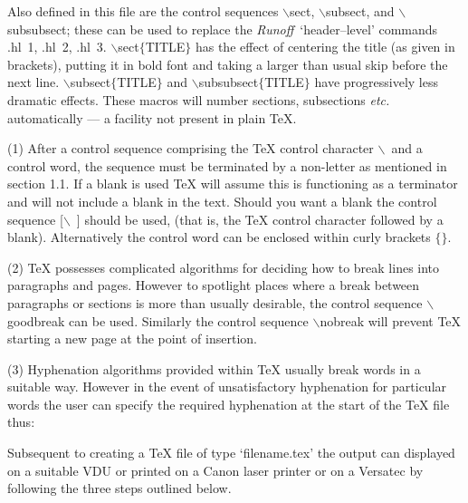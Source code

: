 Also defined in this file are the control sequences $\backslash$sect,
$\backslash$subsect, and $\backslash$subsubsect; these can be used to
replace the {\it Runoff}\
`header--level' commands .hl~1, .hl~2, .hl~3.
$\backslash$sect$\{$TITLE$\}$  has
the effect of centering the
title (as given in brackets), putting it in bold font and taking a larger than
usual skip before the next line.
$\backslash$subsect$\{$TITLE$\}$ and $\backslash$subsubsect$\{$TITLE$\}$
have progressively less dramatic effects.
These macros will number sections, subsections {\it etc.} automatically ---
a facility not present in plain \TeX.


\item{(1)} After a control sequence comprising the {\TeX} control character $\backslash$\
and a control word, the sequence must be terminated by
a non-letter as mentioned in section 1.1.
If a blank is used {\TeX} will assume this is functioning as a
terminator and will not include a blank in the text.
Should you want a blank the control sequence [$\backslash$\ ] should
be used, (that is, the {\TeX} control character followed by a blank).
Alternatively the control word can be enclosed within curly brackets $\{ \}$.

\item{(2)} {\TeX} possesses complicated algorithms for deciding how to break
lines into paragraphs and pages.
However to spotlight places where a break between paragraphs or
sections is more than usually desirable, the  control sequence $\backslash$goodbreak
can be used.
Similarly the control sequence $\backslash$nobreak will prevent {\TeX} starting a new
page at the point of insertion.

\item{(3)} Hyphenation algorithms provided within {\TeX} usually break words in
a suitable way.
However in the event of unsatisfactory hyphenation for particular words
the user can specify the required hyphenation at the start of the {\TeX}
file thus:
\medskip
{}



\vfill\eject


Subsequent to creating a {\TeX} file of type `filename.tex'
the output can displayed on a suitable VDU or printed on a Canon
laser printer or
on a Versatec by following the three steps outlined below.

